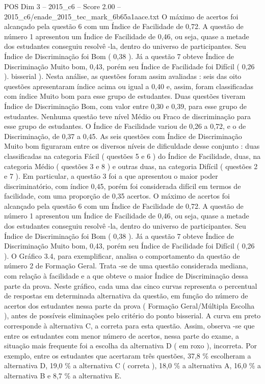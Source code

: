\begin{textsample}{POS Dim 3 – 2015\_c6 – Score 2.00 – 2015\_c6/enade\_2015\_tec\_mark\_6b65a1aace.txt}
O máximo de acertos foi alcançado pela questão 6 com um Índice de Facilidade de 0,72.
A questão de número 1 apresentou um Índice de Facilidade de 0,46, ou seja, quase a metade dos estudantes conseguiu resolvê -la, dentro do universo de participantes.
Seu Índice de Discriminação foi Bom ( 0,38 ).
Já a questão 7 obteve Índice de Discriminação Muito bom, 0,43, porém seu Índice de Facilidade foi Difícil ( 0,26 ). bisserial ).
Nesta análise, as questões foram assim avaliadas : seis das oito questões apresentaram índice acima ou igual a 0,40 e, assim, foram classificadas com índice Muito bom para esse grupo de estudantes.
Duas questões tiveram Índice de Discriminação Bom, com valor entre 0,30 e 0,39, para esse grupo de estudantes.
Nenhuma questão teve nível Médio ou Fraco de discriminação para esse grupo de estudantes.
O Índice de Facilidade variou de 0,26 a 0,72, e o de Discriminação, de 0,37 a 0,45.
As seis questões com Índice de Discriminação Muito bom figuraram entre os diversos níveis de dificuldade desse conjunto : duas classificadas na categoria Fácil ( questões 5 e 6 ) do Índice de Facilidade, duas, na categoria Médio ( questões 3 e 8 ) e outras duas, na categoria Difícil ( questões 2 e 7 ).
Em particular, a questão 3 foi a que apresentou o maior poder discriminatório, com índice 0,45, porém foi considerada difícil em termos de facilidade, com uma proporção de 0,35 acertos.
O máximo de acertos foi alcançado pela questão 6 com um Índice de Facilidade de 0,72.
A questão de número 1 apresentou um Índice de Facilidade de 0,46, ou seja, quase a metade dos estudantes conseguiu resolvê -la, dentro do universo de participantes.
Seu Índice de Discriminação foi Bom ( 0,38 ).
Já a questão 7 obteve Índice de Discriminação Muito bom, 0,43, porém seu Índice de Facilidade foi Difícil ( 0,26 ).
O Gráfico 3.4, para exemplificar, analisa o comportamento da questão de número 2 de Formação Geral.
Trata -se de uma questão considerada mediana, com relação à facilidade e a que obteve o maior Índice de Discriminação dessa parte da prova.
Neste gráfico, cada uma das cinco curvas representa o percentual de respostas em determinada alternativa da questão, em função do número de acertos dos estudantes nessa parte da prova ( Formação Geral/Múltipla Escolha ), antes de possíveis eliminações pelo critério do ponto bisserial.
A curva em preto corresponde à alternativa C, a correta para esta questão.
Assim, observa -se que entre os estudantes com menor número de acertos, nessa parte do exame, a situação mais frequente foi a escolha da alternativa D ( em roxo ), incorreta.
Por exemplo, entre os estudantes que acertaram três questões, 37,8 \% escolheram a alternativa D, 19,0 \% a alternativa C ( correta ), 18,0 \% a alternativa A, 16,0 \% a alternativa B e 8,7 \% a alternativa E.

\end{textsample}
